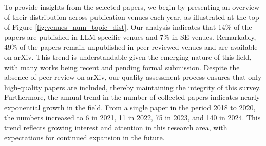 To provide insights from the selected papers, we begin by presenting an overview of their distribution across publication venues each year, as illustrated at the top of Figure \ref{fig:venues_num_topic_dist}. 
Our analysis indicates that 14\% of the papers are published in LLM-specific venues and 7\% in SE venues. Remarkably, 49\% of the papers remain unpublished in peer-reviewed venues and are available on arXiv. 
This trend is understandable given the emerging nature of this field, with many works being recent and pending formal submission. 
Despite the absence of peer review on arXiv, our quality assessment process ensures that only high-quality papers are included, thereby maintaining the integrity of this survey.
Furthermore, the annual trend in the number of collected papers indicates nearly exponential growth in the field. From a single paper in the period 2018 to 2020, the numbers increased to 6 in 2021, 11 in 2022, 75 in 2023, and 140 in 2024. This trend reflects growing interest and attention in this research area, with expectations for continued expansion in the future.
